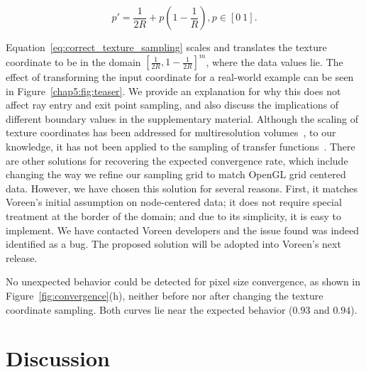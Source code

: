\begin{equation}
	p' = \frac{1}{2R} + p\left(1-\frac{1}{R}\right), p \in [0 \  1].
	\label{eq:correct_texture_sampling}
\end{equation}

Equation~\eqref{eq:correct_texture_sampling} scales and translates the
texture coordinate to be in the domain $[\frac{1}{2R},
  1-\frac{1}{2R}]^m$, where the data values lie.  The effect of
transforming the input coordinate for a real-world example can be seen
in Figure~\ref{chap5:fig:teaser}.  We provide an explanation for why this
does not affect ray entry and exit point sampling, and also discuss
the implications of different boundary values in the supplementary
material.  Although the scaling of texture coordinates has been
addressed for multiresolution volumes~\cite{LjungLY06}, to our
knowledge, it has not been applied to the sampling of transfer
functions~\cite{Real-TimeVolumeGraphics06,Kruger03,Roettger03}.
%
There are other solutions for recovering the expected convergence
rate, which include changing the way we refine our sampling grid to
match OpenGL grid centered data.  However, we have chosen this
solution for several reasons. First, it matches Voreen's initial
assumption on node-centered data; it does not require special
treatment at the border of the domain; and due to its simplicity, it
is easy to implement.
%
We have contacted Voreen developers and the issue found was indeed
identified as a bug. The proposed solution will be adopted into
Voreen's next release.

No unexpected behavior could be detected for pixel size convergence, as
shown in Figure~\ref{fig:convergence}(h), neither before nor
after changing the texture coordinate sampling. Both curves lie near 
the expected behavior ($0.93$ and $0.94$).




\section{Discussion}
\label{chap5:sec:discussion}

